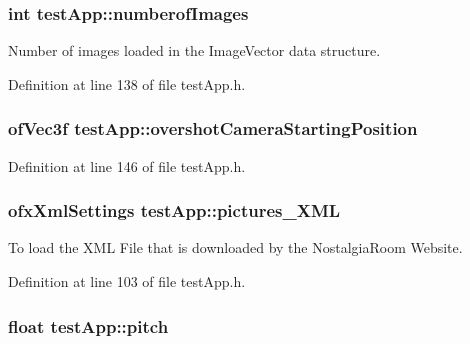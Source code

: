 \hypertarget{classtest_app_a957cf7fdb3ea964a88ca1be13e4d68fc}{
\subsubsection[{numberof\-Images}]{\setlength{\rightskip}{0pt plus 5cm}int test\-App\-::numberof\-Images}}\label{classtest_app_a957cf7fdb3ea964a88ca1be13e4d68fc}


Number of images loaded in the Image\-Vector data structure. 



Definition at line 138 of file test\-App.\-h.

\hypertarget{classtest_app_a846feea7c2c4d4b1929bb72c546b3e19}{
\subsubsection[{overshot\-Camera\-Starting\-Position}]{\setlength{\rightskip}{0pt plus 5cm}of\-Vec3f test\-App\-::overshot\-Camera\-Starting\-Position}}\label{classtest_app_a846feea7c2c4d4b1929bb72c546b3e19}


Definition at line 146 of file test\-App.\-h.

\hypertarget{classtest_app_a85133f49103cfa002f39d882f7168236}{
\subsubsection[{pictures\-\_\-\-X\-M\-L}]{\setlength{\rightskip}{0pt plus 5cm}ofx\-Xml\-Settings test\-App\-::pictures\-\_\-\-X\-M\-L}}\label{classtest_app_a85133f49103cfa002f39d882f7168236}


To load the X\-M\-L File that is downloaded by the Nostalgia\-Room Website. 



Definition at line 103 of file test\-App.\-h.

\hypertarget{classtest_app_aabbebeb113838374f659e86a0355b260}{
\subsubsection[{pitch}]{\setlength{\rightskip}{0pt plus 5cm}float test\-App\-::pitch}}\label{classtest_app_aabbebeb113838374f659e86a0355b260}


